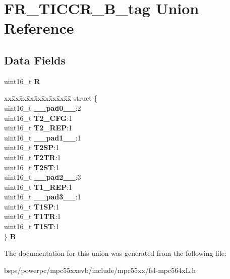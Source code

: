\hypertarget{unionFR__TICCR__16B__tag}{}\section{F\+R\+\_\+\+T\+I\+C\+C\+R\+\_\+B\+\_\+tag Union Reference}
\label{unionFR__TICCR__16B__tag}
\subsection*{Data Fields}
\begin{DoxyCompactItemize}
\item 
\mbox{\label{unionFR__TICCR__16B__tag_a27c46bbf62515b7b8c2f28514b8ede37}} 
uint16\+\_\+t {\bfseries R}
\item 
\mbox{\label{unionFR__TICCR__16B__tag_a61184851a503c060a3f50cf7dd8f652c}} 
\begin{tabbing}
xx\=xx\=xx\=xx\=xx\=xx\=xx\=xx\=xx\=\kill
struct \{\\
\>uint16\_t {\bfseries \_\_pad0\_\_}:2\\
\>uint16\_t {\bfseries T2\_CFG}:1\\
\>uint16\_t {\bfseries T2\_REP}:1\\
\>uint16\_t {\bfseries \_\_pad1\_\_}:1\\
\>uint16\_t {\bfseries T2SP}:1\\
\>uint16\_t {\bfseries T2TR}:1\\
\>uint16\_t {\bfseries T2ST}:1\\
\>uint16\_t {\bfseries \_\_pad2\_\_}:3\\
\>uint16\_t {\bfseries T1\_REP}:1\\
\>uint16\_t {\bfseries \_\_pad3\_\_}:1\\
\>uint16\_t {\bfseries T1SP}:1\\
\>uint16\_t {\bfseries T1TR}:1\\
\>uint16\_t {\bfseries T1ST}:1\\
\} {\bfseries B}\\

\end{tabbing}\end{DoxyCompactItemize}


The documentation for this union was generated from the following file\+:\begin{DoxyCompactItemize}
\item 
bsps/powerpc/mpc55xxevb/include/mpc55xx/fsl-\/mpc564x\+L.\+h\end{DoxyCompactItemize}
